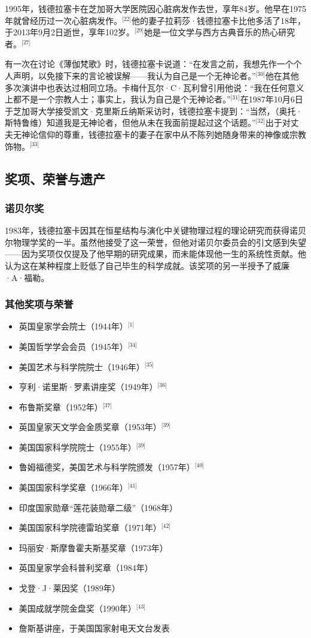 1995年，钱德拉塞卡在芝加哥大学医院因心脏病发作去世，享年84岁。他早在1975年就曾经历过一次心脏病发作。\(^\text{[22]}\)他的妻子拉莉莎·钱德拉塞卡比他多活了18年，于2013年9月2日逝世，享年102岁。\(^\text{[29]}\)她是一位文学与西方古典音乐的热心研究者。\(^\text{[27]}\)

有一次在讨论《薄伽梵歌》时，钱德拉塞卡说道：“在发言之前，我想先作一个个人声明，以免接下来的言论被误解——我认为自己是一个无神论者。”\(^\text{[30]}\)他在其他多次演讲中也表达过相同立场。卡梅什瓦尔·C·瓦利曾引用他说：“我在任何意义上都不是一个宗教人士；事实上，我认为自己是个无神论者。”\(^\text{[31]}\)在1987年10月6日于芝加哥大学接受凯文·克里斯丘纳斯采访时，钱德拉塞卡提到：“当然，（奥托·斯特鲁维）知道我是无神论者，但他从未在我面前提起过这个话题。”\(^\text{[32]}\)出于对丈夫无神论信仰的尊重，钱德拉塞卡的妻子在家中从不陈列她随身带来的神像或宗教饰物。\(^\text{[33]}\)
\subsection{奖项、荣誉与遗产}
\subsubsection{诺贝尔奖}
1983年，钱德拉塞卡因其在恒星结构与演化中关键物理过程的理论研究而获得诺贝尔物理学奖的一半。虽然他接受了这一荣誉，但他对诺贝尔委员会的引文感到失望——因为奖项仅仅提及了他早期的研究成果，而未能体现他一生的系统性贡献。他认为这在某种程度上贬低了自己毕生的科学成就。该奖项的另一半授予了威廉·A·福勒。
\subsubsection{其他奖项与荣誉}
\begin{itemize}
\item 英国皇家学会院士（1944年）\(^\text{[1]}\)
\item 美国哲学学会会员（1945年）\(^\text{[34]}\)
\item 美国艺术与科学院院士（1946年）\(^\text{[35]}\)
\item 亨利·诺里斯·罗素讲座奖（1949年）\(^\text{[36]}\)
\item 布鲁斯奖章（1952年）\(^\text{[37]}\)
\item 英国皇家天文学会金质奖章（1953年）\(^\text{[39]}\)
\item 美国国家科学院院士（1955年）\(^\text{[39]}\)
\item 鲁姆福德奖，美国艺术与科学院颁发（1957年）\(^\text{[40]}\)
\item 美国国家科学奖章（1966年）\(^\text{[41]}\)
\item 印度国家勋章“莲花装勋章二级”（1968年）
\item 美国国家科学院德雷珀奖章（1971年）\(^\text{[42]}\)
\item 玛丽安·斯摩鲁霍夫斯基奖章（1973年）
\item 英国皇家学会科普利奖章（1984年）
\item 戈登·J·莱因奖（1989年）
\item 美国成就学院金盘奖（1990年）\(^\text{[43]}\)
\item 詹斯基讲座，于美国国家射电天文台发表
\end{itemize}
